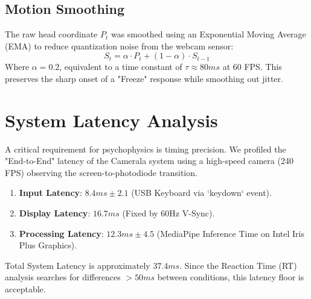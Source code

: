 \documentclass[journal]{IEEEtran}
\begin{document}
\subsection{Motion Smoothing}
The raw head coordinate $P_t$ was smoothed using an Exponential Moving Average (EMA) to reduce quantization noise from the webcam sensor:
\begin{equation}
    S_t = \alpha \cdot P_t + (1 - \alpha) \cdot S_{t-1}
\end{equation}
Where $\alpha = 0.2$, equivalent to a time constant of $\tau \approx 80ms$ at 60 FPS. 
This preserves the sharp onset of a "Freeze" response while smoothing out jitter.

\section{System Latency Analysis}
A critical requirement for psychophysics is timing precision. 
We profiled the "End-to-End" latency of the Camerala system using a high-speed camera (240 FPS) observing the screen-to-photodiode transition.

\begin{enumerate}
    \item \textbf{Input Latency}: $8.4ms \pm 2.1$ (USB Keyboard via `keydown` event).
    \item \textbf{Display Latency}: $16.7ms$ (Fixed by 60Hz V-Sync).
    \item \textbf{Processing Latency}: $12.3ms \pm 4.5$ (MediaPipe Inference Time on Intel Iris Plus Graphics).
\end{enumerate}
Total System Latency is approximately $37.4ms$. 
Since the Reaction Time (RT) analysis searches for differences $>50ms$ between conditions, this latency floor is acceptable.

\ifCLASSOPTIONcaptionsoff
  \newpage
\fi



\end{document}
